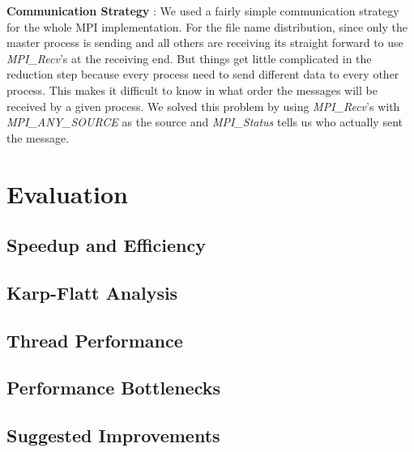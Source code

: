 \documentclass[12pt]{article}
\begin{document}
\noindent \textbf{Communication Strategy} : We used a fairly simple communication strategy for the whole MPI implementation. For the file name distribution, since only the master process is sending and all others are 
receiving its straight forward to use {\em MPI\_Recv}'s at the receiving end. But things get little complicated in the reduction step because every process need to send different data to every other process. This makes 
it difficult to know in what order the messages will be received by a given process. We solved this problem by using {\em MPI\_Recv}'s with {\em MPI\_ANY\_SOURCE} as the source and {\em MPI\_Status} tells us who actually sent 
the message.
\section{Evaluation}
\subsection{Speedup and Efficiency}
\subsection{Karp-Flatt Analysis}
\subsection{Thread Performance}
\subsection{Performance Bottlenecks}
\subsection{Suggested Improvements}
\end{document}
